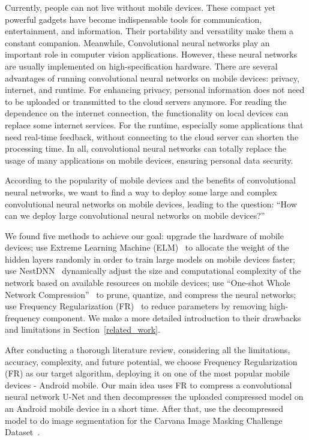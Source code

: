 \documentclass[runningheads]{llncs}
\begin{document}
Currently, people can not live without mobile devices. These compact yet powerful gadgets have become indispensable tools for communication, entertainment, and information. Their portability and versatility make them a constant companion. Meanwhile, Convolutional neural networks play an important role in computer vision applications. However, these neural networks are usually implemented on high-specification hardware. There are several advantages of running convolutional neural networks on mobile devices: privacy, internet, and runtime. For enhancing privacy, personal information does not need to be uploaded or transmitted to the cloud servers anymore. For reading the dependence on the internet connection, the functionality on local devices can replace some internet services. For the runtime, especially some applications that need real-time feedback, without connecting to the cloud server can shorten the processing time. In all, convolutional neural networks can totally replace the usage of many applications on mobile devices, ensuring personal data security. 

According to the popularity of mobile devices and the benefits of convolutional neural networks, we want to find a way to deploy some large and complex convolutional neural networks on mobile devices, leading to the question: “How can we deploy large convolutional neural networks on mobile devices?”

We found five methods to achieve our goal: upgrade the hardware of mobile devices; use Extreme Learning Machine (ELM)~\cite{anton2021elm} to allocate the weight of the hidden layers randomly in order to train large models on mobile devices faster; use NestDNN~\cite{fang2018nestdnn} dynamically adjust the size and computational complexity of the network based on available resources on mobile devices; use “One-shot Whole Network Compression”~\cite{kim2016oneshot} to prune, quantize, and compress the neural networks; use Frequency Regularization (FR)~\cite{zhao2023fr} to reduce parameters by removing high-frequency component. We make a more detailed introduction to their drawbacks and limitations in Section~\ref{related_work}.

After conducting a thorough literature review, considering all the limitations, accuracy, complexity, and future potential, we choose Frequency Regularization (FR) as our target algorithm, deploying it on one of the most popular mobile devices - Android mobile. Our main idea uses FR to compress a convolutional neural network U-Net and then decompresses the uploaded compressed model on an Android mobile device in a short time. After that, use the decompressed model to do image segmentation for the Carvana Image Masking Challenge Dataset~\cite{brian2017carvanadataset}. 
\end{document}
